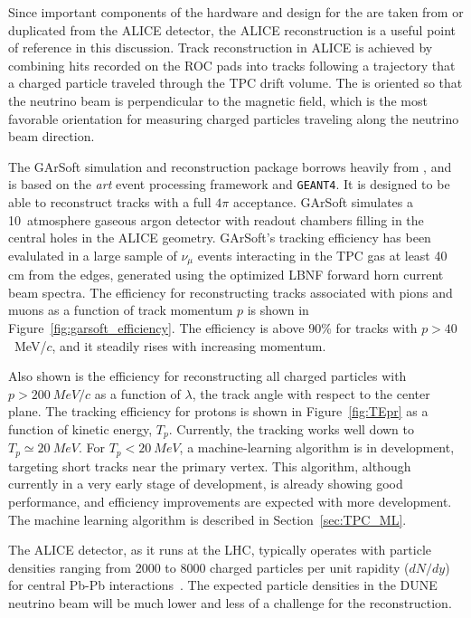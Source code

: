 Since important components of the hardware and design for the  are taken from or duplicated from the ALICE detector, the ALICE reconstruction is a useful point of reference in this discussion.
Track reconstruction in ALICE is achieved by combining hits recorded on the ROC pads into tracks following a trajectory that a charged particle traveled through the TPC drift volume.  The  is oriented so that the neutrino beam is perpendicular to the magnetic field, which is the most favorable orientation for measuring charged particles traveling along the neutrino beam direction.   

The GArSoft simulation and reconstruction package borrows heavily from  , and is based on the {\it art} event processing framework and {\tt GEANT4}.  It is designed to be able to reconstruct tracks with a full $4\pi$ acceptance.   GArSoft simulates a 10~atmosphere gaseous argon detector with readout chambers filling in the central holes in the ALICE geometry.  GArSoft's tracking efficiency has been evalulated in a large sample of  $\nu_\mu$ events interacting in the TPC gas at least 40 cm from the edges, generated using the optimized LBNF forward horn current beam spectra. The efficiency
for reconstructing tracks associated with pions and muons as a function of track momentum $p$ is shown in  Figure~\ref{fig:garsoft_efficiency}.  The efficiency is above 90\% for tracks with $p>40$~MeV/$c$, and it steadily rises with increasing momentum.  

Also shown is the efficiency for reconstructing all charged particles with $p>\SI{200}{MeV/c}$ as a function of $\lambda$,  the track angle with respect to the center plane.  The tracking efficiency for protons is shown in Figure~\ref{fig:TEpr} as a function of kinetic energy, $T_p$.  Currently, the tracking works well down to $T_p \simeq \SI{20}{MeV}$. For $T_p < \SI{20}{MeV}$, a machine-learning algorithm is in development, targeting short tracks near the primary vertex. This algorithm, although currently in a very early stage of development, is already showing good performance, and efficiency improvements are expected with more development. The machine learning algorithm is described in Section~\ref{sec:TPC_ML}.

The ALICE detector, as it runs at the LHC, typically operates with particle densities ranging from 2000 to 8000 charged particles per unit rapidity ($dN/dy$) for central Pb-Pb interactions~\cite{Cheshkov:2006ym}. The expected particle densities in the DUNE neutrino beam will be much lower and less of a challenge for the reconstruction. 

